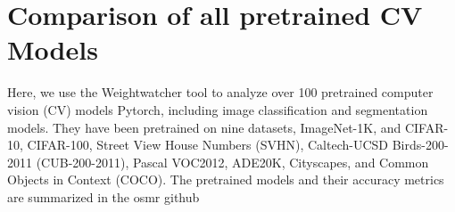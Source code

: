 \section{Comparison of all pretrained CV Models}
\label{sxn:all_cv_models}


Here, we use the Weightwatcher tool to analyze over 100 pretrained computer vision (CV) models Pytorch, including image classification and segmentation models.  They have been pretrained on nine datasets, ImageNet-1K, and CIFAR-10, CIFAR-100, Street View House Numbers (SVHN), Caltech-UCSD Birds-200-2011 (CUB-200-2011), Pascal VOC2012, ADE20K, Cityscapes, and Common Objects in Context (COCO). The pretrained models and their accuracy metrics are summarized in the osmr github 



